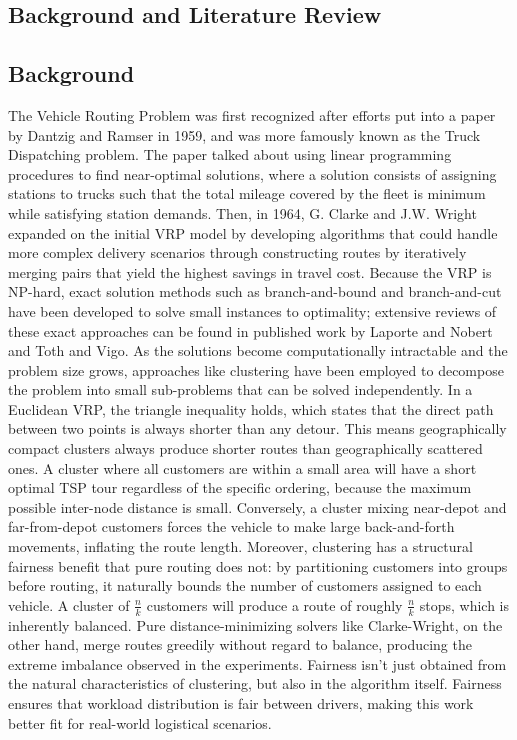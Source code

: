 \documentclass[a4paper]{report}
\begin{document}
{\begin{itemize}
\chapter{Background and Literature Review }


\section{Background}
The Vehicle Routing Problem was first recognized after efforts put into a paper by Dantzig and Ramser in 1959\cite{truckDispatching}, and was more famously known as the Truck Dispatching problem. 
The paper talked about using linear programming procedures to find near-optimal solutions, where a solution consists of assigning stations to trucks such that the total mileage covered by the fleet is minimum while satisfying station demands.
\newline
Then, in 1964, G. Clarke and J.W. Wright\cite{ClarkeWright} expanded on the initial VRP model by developing algorithms that could handle more complex delivery scenarios through constructing routes by iteratively merging pairs that yield the highest savings in travel cost.
\newline
Because the VRP is NP-hard\cite{complexity}, exact solution methods such as branch-and-bound\cite{branchBound} and branch-and-cut\cite{branchCut} have been developed to solve small instances to optimality; extensive reviews of these exact approaches can be found in published work by Laporte and Nobert\cite{LaporteAndNobert} and Toth and Vigo\cite{VigoAndToth}. As the solutions become computationally intractable and the problem size grows, approaches like clustering have been employed to decompose the problem into small  sub-problems that can be solved independently\cite{clustering}.
In a Euclidean VRP, the triangle inequality holds, which states that the direct path between two points is always shorter than any detour. This means geographically compact clusters always produce shorter routes than geographically scattered ones. A cluster where all customers are within a small area will have a short optimal TSP tour regardless of the specific ordering, because the maximum possible inter-node distance is small. Conversely, a cluster mixing near-depot and far-from-depot customers forces the vehicle to make large back-and-forth movements, inflating the route length. 
Moreover, clustering has a structural fairness benefit that pure routing does not: by partitioning customers into groups before routing, it naturally bounds the number of customers assigned to each vehicle. A cluster of $\frac{n}{k}$ customers will produce a route of roughly $\frac{n}{k}$ stops, which is inherently balanced. Pure distance-minimizing solvers like Clarke-Wright, on the other hand, merge routes greedily without regard to balance, producing the extreme imbalance observed in the experiments. 
Fairness isn't just obtained from the natural characteristics of clustering, but also in the algorithm itself. Fairness ensures that workload distribution is fair between drivers, making this work better fit for real-world logistical scenarios. 





\end{itemize}}
\end{document}
